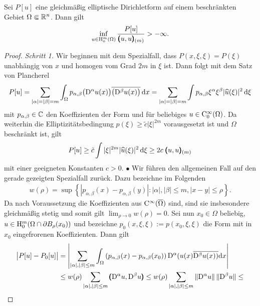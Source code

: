 \begin{thm}
Sei $P[u]$ eine gleichmäßig elliptische Dirichletform auf einem beschränkten Gebiet $\Omega\Subset\mathbb R^n$. Dann gilt
\begin{equation}
  \inf_{u\in\mathrm H_0^m(\Omega)} \frac{P[u]}{\pmb(u,u\pmb)_{(m)}} > -\infty.
\end{equation}
\end{thm}
\begin{proof}
{\sl Schritt 1.} Wir beginnen mit dem Spezialfall, dass $P(x,\xi,\xi) = P(\xi)$ unabhängig von $x$ und homogen vom Grad $2m$ in $\xi$ ist. Dann folgt mit dem Satz von Plancherel
\begin{equation}
 P[u] =  \sum_{|\alpha|=|\beta|=m} \int_\Omega  p_{\alpha,\beta} \big(\mathrm D^\alpha u(x)\big)\overline{\big(\mathrm D^\beta u(x)\big)} \,\mathrm d x
 =   \sum_{|\alpha|=|\beta|=m} \int  p_{\alpha,\beta} \xi^\alpha \xi^\beta  |\widehat u(\xi)|^2 \,\mathrm d\xi 
\end{equation}
mit $p_{\alpha,\beta}\in\mathbb C$ den Koeffizienten der Form und für beliebiges $u\in\mathrm C_0^\infty(\Omega)$. Da weiterhin die Elliptizitätsbedingung $p(\xi)\ge \tilde c |\xi|^{2m}$ 
vorausgesetzt ist und $\Omega$ beschränkt ist, gilt
\begin{equation}
  P[u] \ge \tilde c \int |\xi|^{2m} |\widehat u(\xi)|^2 \,\mathrm d\xi \ge  2c\; \pmb(u,u\pmb)_{(m)}
\end{equation}
mit einer geeigneten Konstanten $c>0$. $\bullet$  Wir führen den allgemeinen Fall auf den gerade gezeigten Spezialfall zurück. Dazu bezeichne im Folgenden
\begin{align}
	w(\rho) = \sup\left\{| p_{\alpha,\beta}(x)-p_{\alpha,\beta}(y)| : |\alpha|, |\beta| \le m, | x-y| \le \rho\right\}.
\end{align} 
Da nach Voraussetzung die Koeffizienten aus $\mathrm C^\infty(\overline\Omega)$ sind, sind sie insbesondere gleichmäßig stetig und somit gilt
$\lim_{\rho\to0} w(\rho)=0$.  Sei nun $x_0\in \Omega$ beliebig, $u\in \mathrm H_0^m(\Omega\cap \partial B_\rho(x_0))$ und bezeichne $p_0(x,\xi, \xi):=p(x_0,\xi,\xi)$ die Form mit in $x_0$ eingefrorenen Koeffizienten. Dann gilt
\begin{align}
\begin{split}
\big| P[u]-P_0[u] \big| &=\left| \sum\limits_{|\alpha|, |\beta| \le m} \int_\Omega \left(p_{\alpha,\beta}(x)-p_{\alpha,\beta}(x_0)\right){\D^\alpha(u(x)}\overline{\D^\beta u(x))}\mathrm{d}x\right|\\
	&\le w(\rho) \sum\limits_{|\alpha|,|\beta| \le m} \spro{\D^\alpha u}{\D^\beta u} \le  w(\rho) \sum\limits_{|\alpha|,|\beta| \le m}\|\D^\alpha u\|\, \|\D^\beta u\| \le

\end{split}
\end{align}
\end{proof}
